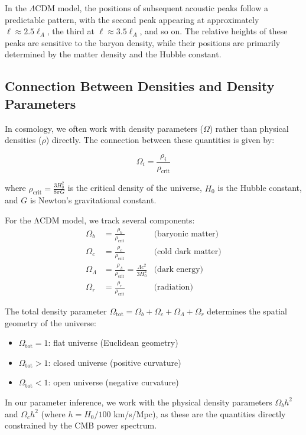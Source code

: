 \documentclass[11pt]{article}
\begin{document}
In the $\Lambda$CDM model, the positions of subsequent acoustic peaks follow a predictable pattern, with the second peak appearing at approximately $\ell \approx 2.5\ell_A$, the third at $\ell \approx 3.5\ell_A$, and so on. The relative heights of these peaks are sensitive to the baryon density, while their positions are primarily determined by the matter density and the Hubble constant.

\subsection{Connection Between Densities and Density Parameters}

In cosmology, we often work with density parameters ($\Omega$) rather than physical densities ($\rho$) directly. The connection between these quantities is given by:

\begin{equation}
\Omega_i = \frac{\rho_i}{\rho_{\text{crit}}}
\end{equation}

where $\rho_{\text{crit}} = \frac{3H_0^2}{8\pi G}$ is the critical density of the universe, $H_0$ is the Hubble constant, and $G$ is Newton's gravitational constant.

For the ΛCDM model, we track several components:
\begin{align}
\Omega_b &= \frac{\rho_b}{\rho_{\text{crit}}} & \text{(baryonic matter)} \\
\Omega_c &= \frac{\rho_c}{\rho_{\text{crit}}} & \text{(cold dark matter)} \\
\Omega_{\Lambda} &= \frac{\rho_{\Lambda}}{\rho_{\text{crit}}} = \frac{\Lambda c^2}{3H_0^2} & \text{(dark energy)} \\
\Omega_r &= \frac{\rho_r}{\rho_{\text{crit}}} & \text{(radiation)}
\end{align}

The total density parameter $\Omega_{\text{tot}} = \Omega_b + \Omega_c + \Omega_{\Lambda} + \Omega_r$ determines the spatial geometry of the universe:
\begin{itemize}
\item $\Omega_{\text{tot}} = 1$: flat universe (Euclidean geometry)
\item $\Omega_{\text{tot}} > 1$: closed universe (positive curvature)
\item $\Omega_{\text{tot}} < 1$: open universe (negative curvature)
\end{itemize}

In our parameter inference, we work with the physical density parameters $\Omega_b h^2$ and $\Omega_c h^2$ (where $h = H_0/100$ km/s/Mpc), as these are the quantities directly constrained by the CMB power spectrum.
\end{document}
